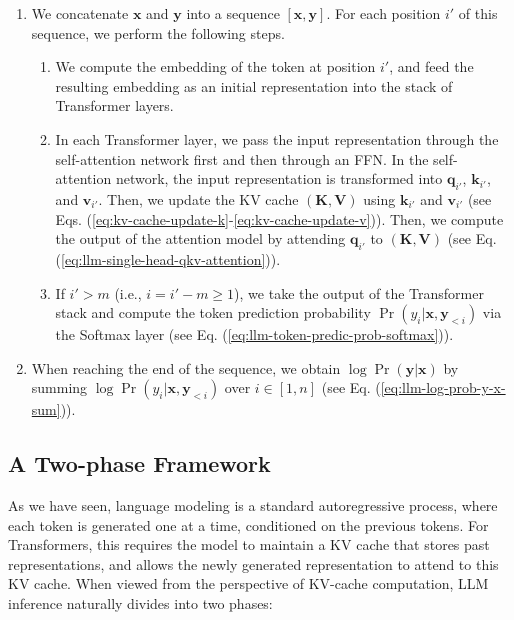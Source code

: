 \begin{enumerate}
\item \vspace{0.5em} We concatenate $\mathbf{x}$ and $\mathbf{y}$ into a sequence $[\mathbf{x},\mathbf{y}]$. For each position $i'$ of this sequence, we perform the following steps.
\begin{enumerate}
\item \vspace{0.3em} We compute the embedding of the token at position $i'$, and feed the resulting embedding as an initial representation into the stack of Transformer layers.
\item \vspace{0.3em} In each Transformer layer, we pass the input representation through the self-attention network first and then through an FFN. In the self-attention network, the input representation is transformed into  $\mathbf{q}_{i'}$, $\mathbf{k}_{i'}$, and $\mathbf{v}_{i'}$. Then, we update the KV cache $(\mathbf{K},\mathbf{V})$ using $\mathbf{k}_{i'}$ and $\mathbf{v}_{i'}$ (see Eqs. (\ref{eq:kv-cache-update-k}-\ref{eq:kv-cache-update-v})). Then, we compute the output of the attention model by attending $\mathbf{q}_{i'}$ to $(\mathbf{K},\mathbf{V})$ (see Eq. (\ref{eq:llm-single-head-qkv-attention})).
\item If $i' > m$ (i.e., $i = i' - m \ge 1$), we take the output of the Transformer stack and compute the token prediction probability $\Pr(y_i|\mathbf{x},\mathbf{y}_{<i})$ via the Softmax layer (see Eq. (\ref{eq:llm-token-predic-prob-softmax})).
\end{enumerate}
\item When reaching the end of the sequence, we obtain $\log \Pr(\mathbf{y}|\mathbf{x})$ by summing $\log \Pr(y_i|\mathbf{x},\mathbf{y}_{<i})$ over $i \in [1,n]$ (see Eq. (\ref{eq:llm-log-prob-y-x-sum})).
\end{enumerate}
\vspace{0.5em}

\subsection{A Two-phase Framework}
\label{sec:llm-inference-prefilling-and-decoding}

As we have seen, language modeling is a standard autoregressive process, where each token is generated one at a time, conditioned on the previous tokens. For Transformers, this requires the model to maintain a KV cache that stores past representations, and allows the newly generated representation to attend to this KV cache. When viewed from the perspective of KV-cache computation, LLM inference naturally divides into two phases:

